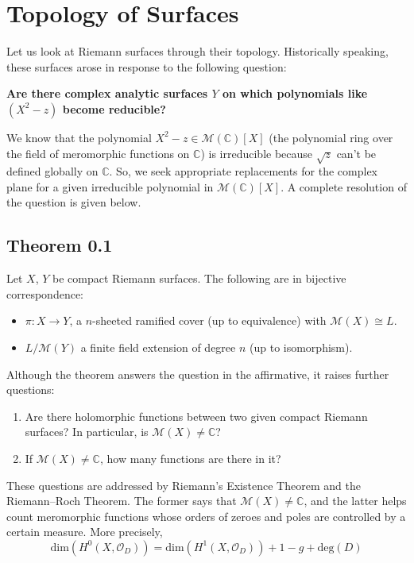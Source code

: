 \documentclass[11pt,a4paper]{article}
\begin{document}
\section*{Topology of Surfaces}
Let us look at Riemann surfaces through their topology. Historically speaking, these surfaces arose in response to the following question:

\textbf{Are there complex analytic surfaces $Y$ on which polynomials like $(X^2 - z)$ become reducible?}

We know that the polynomial $X^2-z \in \mathcal{M}(\mathbb{C})[X]$ (the polynomial ring over the field of meromorphic functions on $\mathbb{C}$) is irreducible because $\sqrt{z}$ can't be defined globally on $\mathbb{C}$. So, we seek appropriate replacements for the complex plane for a given irreducible polynomial in $\mathcal{M}(\mathbb{C})[X]$. A complete resolution of the question is given below.

\subsection*{Theorem 0.1} Let $X$, $Y$ be compact Riemann surfaces. The following are in bijective correspondence:
\begin{itemize}
    \item $\pi:X\rightarrow Y$, a $n$-sheeted ramified cover (up to equivalence) with $\mathcal{M}(X) \cong L$.
    \item $L/\mathcal{M}(Y)$ a finite field extension of degree $n$ (up to isomorphism).
\end{itemize}


Although the theorem answers the question in the affirmative, it raises further questions:

\begin{enumerate}
    \item Are there holomorphic functions between two given compact Riemann surfaces? In particular, is $\mathcal{M}(X) \neq \mathbb C$?
    \item If $\mathcal{M}(X) \neq \mathbb C$, how many functions are there in it?
\end{enumerate}
These questions are addressed by Riemann's Existence Theorem and the Riemann--Roch Theorem. The former says that $\mathcal{M}(X) \neq \mathbb C$, and the latter helps count meromorphic functions whose orders of zeroes and poles are controlled by a certain measure. More precisely,
\begin{equation*}
    \text{dim}(H^0(X, \mathcal{O}_D)) = \text{dim}(H^1(X, \mathcal{O}_D)) + 1 - g + \text{deg}(D)
\end{equation*}
\end{document}
